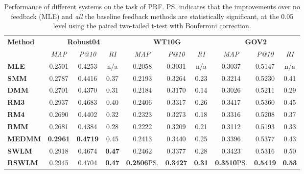 \begin{table}[tbp]
\caption{\label{tbl_prf}Performance of different systems on the task of PRF. \ps indicates that the improvements over no feedback (MLE) and \emph{all} the baseline feedback methods are statistically significant, at the 0.05 level using the paired two-tailed t-test with Bonferroni correction.}
\begin{adjustbox}{max width=\columnwidth}
\begin{tabular}{lccccccccc}
\toprule
\multirow{2}{*}{\textbf{Method}} &
\multicolumn{3}{c}{\textbf{Robust04}} & \multicolumn{3}{c}{\textbf{WT10G}} & \multicolumn{3}{c}{\textbf{GOV2}} 
\\ \cmidrule(lr){2-4} \cmidrule(lr){5-7} \cmidrule(lr){8-10}
& \textit{MAP} & \textit{P@10} & \textit{RI} & \textit{MAP} & \textit{P@10} &  \textit{RI} &  \textit{MAP} & \textit{P@10}   & \textit{RI} 
\\ \midrule
\textbf{MLE} & 0.2501 & 0.4253 & n/a & 0.2058 & 0.3031 & n/a & 0.3037 & 0.5147 & n/a
\\ 
\textbf{SMM} & 0.2787 & 0.4416 & 0.37 & 0.2193 & 0.3264 & 0.23 & 0.3214 & 0.5230 & 0.41 \\ 
\textbf{DMM} & 0.2701 & 0.4370 & 0.31 & 0.2184 & 0.3170 & 0.14 & 0.3026 & 0.5211 & 0.29 \\ 
\textbf{RM3} & 0.2937 & 0.4683 & 0.40 & 0.2406 & 0.3317 & 0.26 & 0.3417 & 0.5360 & 0.45 \\ 
\textbf{RM4} & 0.2690 & 0.4402 & 0.32 & 0.2323 & 0.3273 & 0.18 & 0.3316 & 0.5208 & 0.37 \\ 
\textbf{RMM} & 0.2681 & 0.4384 & 0.28 & 0.2222 & 0.3209 & 0.21 & 0.3112 & 0.5193 & 0.33 \\ 
\textbf{MEDMM} & \textbf{0.2961} & \textbf{0.4719} & 0.45  & 0.2413 & 0.3440 & 0.25 & 0.3396 & 0.5377 & 0.43 \\ 
\textbf{SWLM} & 0.2918 & 0.4674 & \textbf{0.47} & 0.2462 & 0.3377 & 0.28 & 0.3423 & 0.5316 & 0.50 \\ 
\textbf{RSWLM} & 0.2945 & 0.4704 & \textbf{0.47} &\textbf{0.2506}\ps & \textbf{0.3427} & \textbf{0.31} & \textbf{0.3510}\ps & \textbf{0.5419} & \textbf{0.53}
\\ \bottomrule 
\end{tabular}
\end{adjustbox}
\end{table}


